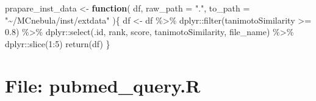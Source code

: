 \documentclass[
]{article}
\newenvironment{Shaded}{\begin{snugshade}}{\end{snugshade}}
\newcommand{\AttributeTok}[1]{\textcolor[rgb]{0.77,0.63,0.00}{#1}}
\newcommand{\ControlFlowTok}[1]{\textcolor[rgb]{0.13,0.29,0.53}{\textbf{#1}}}
\newcommand{\DecValTok}[1]{\textcolor[rgb]{0.00,0.00,0.81}{#1}}
\newcommand{\FloatTok}[1]{\textcolor[rgb]{0.00,0.00,0.81}{#1}}
\newcommand{\FunctionTok}[1]{\textcolor[rgb]{0.00,0.00,0.00}{#1}}
\newcommand{\NormalTok}[1]{#1}
\newcommand{\OtherTok}[1]{\textcolor[rgb]{0.56,0.35,0.01}{#1}}
\newcommand{\SpecialCharTok}[1]{\textcolor[rgb]{0.00,0.00,0.00}{#1}}
\newcommand{\StringTok}[1]{\textcolor[rgb]{0.31,0.60,0.02}{#1}}
\begin{document}
\begin{Shaded}
\begin{Highlighting}[]
\NormalTok{prapare\_inst\_data }\OtherTok{\textless{}{-}} 
  \ControlFlowTok{function}\NormalTok{(}
\NormalTok{           df,}
           \AttributeTok{raw\_path =} \StringTok{"."}\NormalTok{,}
           \AttributeTok{to\_path =} \StringTok{"\textasciitilde{}/MCnebula/inst/extdata"}
\NormalTok{           )\{}
\NormalTok{    df }\OtherTok{\textless{}{-}}\NormalTok{ df }\SpecialCharTok{\%\textgreater{}\%} 
\NormalTok{      dplyr}\SpecialCharTok{::}\FunctionTok{filter}\NormalTok{(tanimotoSimilarity }\SpecialCharTok{\textgreater{}=} \FloatTok{0.8}\NormalTok{) }\SpecialCharTok{\%\textgreater{}\%} 
\NormalTok{      dplyr}\SpecialCharTok{::}\FunctionTok{select}\NormalTok{(.id, rank, score, tanimotoSimilarity, file\_name) }\SpecialCharTok{\%\textgreater{}\%} 
\NormalTok{      dplyr}\SpecialCharTok{::}\FunctionTok{slice}\NormalTok{(}\DecValTok{1}\SpecialCharTok{:}\DecValTok{5}\NormalTok{)}
    \FunctionTok{return}\NormalTok{(df)}
\NormalTok{  \}}
\end{Highlighting}
\end{Shaded}

\hypertarget{file-pubmed_query.r}{%
\section{File: pubmed\_query.R}\label{file-pubmed_query.r}}
\end{document}

